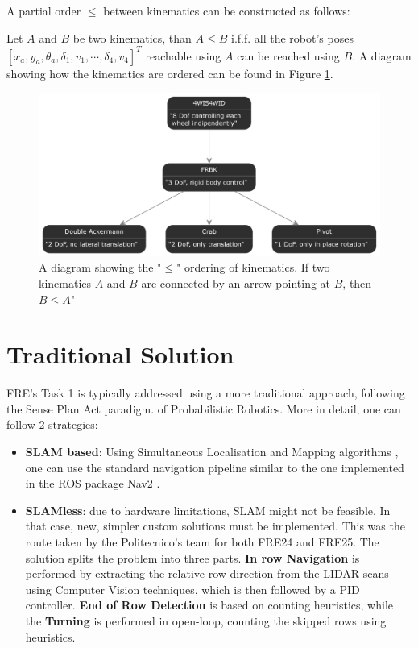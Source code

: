 \documentclass[11pt,a4paper,twocolumn]{article}
\begin{document}
A partial order $\leq$ between kinematics can be constructed as follows:

Let $A$ and $B$ be two kinematics, than $A \leq B$ i.f.f. all the robot's poses $[x_a, y_a, \theta_a, \delta_1, v_1, \cdots, \delta_4,v_4]^T$ reachable using $A$ can be reached using $B$. A diagram showing how the kinematics are ordered can be found in Figure \ref{fig:poset}.

\begin{figure}
    \centering
    \includegraphics[width=1\linewidth]{Multidisciplinary_Project_Report/Images/poset.png}
    \caption{A diagram showing the "$\leq$" ordering of kinematics. If two kinematics $A$ and $B$ are connected by an arrow pointing at $B$, then $B \leq A$"}
    \label{fig:poset}
\end{figure}

\section{Traditional Solution}
\label{sec:trad}
FRE's Task 1 is typically addressed using a more traditional approach, following the Sense Plan Act paradigm. of Probabilistic Robotics. More in detail, one can follow 2 strategies:
\begin{itemize}
    \item \textbf{SLAM based}: Using Simultaneous Localisation and Mapping algorithms \cite{DurrantWhyte2006SimultaneousLA} \cite{ProbabilisticRobotics}, one can use the standard navigation pipeline similar to the one implemented in the ROS package Nav2 \cite{nav2}.
    \item \textbf{SLAMless}: due to hardware limitations, SLAM might not be feasible. In that case, new, simpler custom solutions must be implemented. This was the route taken by the Politecnico's team for both FRE24 and FRE25. The solution splits the problem into three parts. \textbf{In row Navigation} is performed by extracting the relative row direction from the LIDAR scans using Computer Vision techniques, which is then followed by a PID controller. \textbf{End of Row Detection} is based on counting heuristics, while the \textbf{Turning} is performed in open-loop, counting the skipped rows using heuristics. 
\end{itemize}
\end{document}
